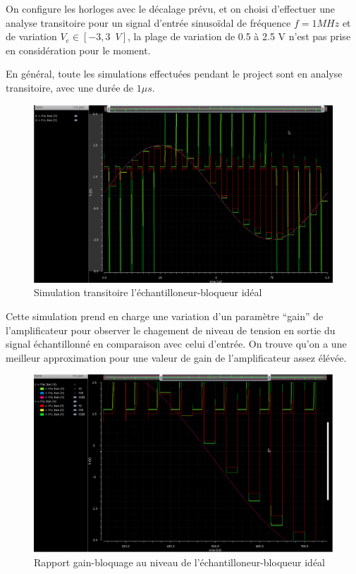 \documentclass[11pt]{article}
\begin{document}
\clearpage

On configure les horloges avec le d\'ecalage pr\'evu, et on choisi d'effectuer
une analyse transitoire pour un signal d'entr\'ee sinuso\"idal de fr\'equence
$f = 1 MHz$ et de variation $V_e \in [-3, 3\phantom{1}V]$, la plage de variation
de 0.5 \`a 2.5 V n'est pas prise en consid\'eration pour le moment.

En g\'en\'eral, toute les simulations effectu\'ees pendant le project sont en analyse
transitoire, avec une dur\'ee de $1 \mu s$.

\begin{figure}[!htb]
\begin{center}
  \includegraphics[width=0.8\linewidth]{simu_ech_bloqueur.png}
  \caption{Simulation transitoire l'\'echantilloneur-bloqueur id\'eal}
\end{center}
\end{figure}

Cette simulation prend en charge une variation d'un param\`etre ``gain'' de l'amplificateur
pour observer le chagement de niveau de tension en sortie du signal \'echantillonn\'e
en comparaison avec celui d'entr\'ee. On trouve qu'on a une meilleur approximation pour une
valeur de gain de l'amplificateur assez \'el\'ev\'ee.

\begin{figure}[!htb]
\begin{center}
  \includegraphics[width=0.76\linewidth]{rapport_gain_bloquage.png}
  \caption{Rapport gain-bloquage au niveau de l'\'echantilloneur-bloqueur id\'eal}
\end{center}
\end{figure}
\end{document}
